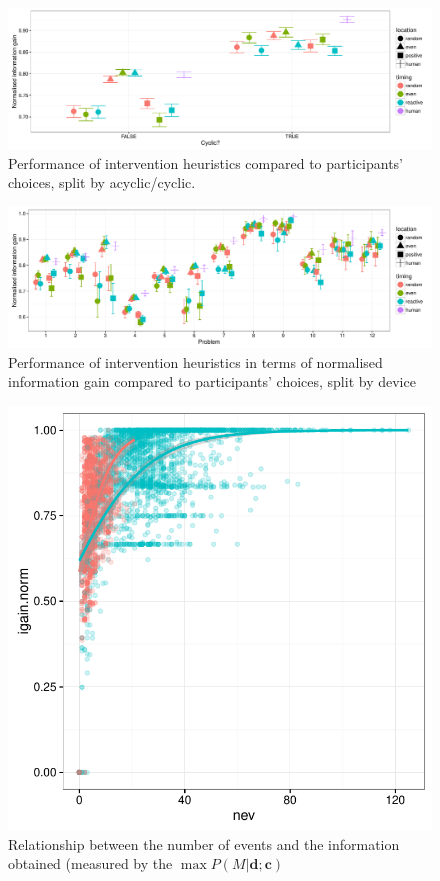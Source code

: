 \documentclass[12pt]{article}
\begin{document}
\begin{figure}[h]
   \centering
   \includegraphics[width = \columnwidth]{int_sim_performance_cyclic}
   \caption{Performance of intervention heuristics compared to participants' choices, split by acyclic/cyclic.}
   \label{fig:int_sim_performance_cyclic}
\end{figure}

\begin{figure}[h]
   \centering
   \includegraphics[width = \columnwidth]{int_sim_performance_trial}
   \caption{Performance of intervention heuristics in terms of normalised information gain compared to participants' choices, split by device}
   \label{fig:int_sim_performance_trial}
\end{figure}


\begin{figure}[h]
   \centering
   \includegraphics[width = .48\columnwidth]{nev_igain_correlation}
   \caption{Relationship between the number of events and the information obtained (measured by the $\max P(M|\mathbf{d};\mathbf{c})$}
   \label{fig:nev_max_p_correlation}
\end{figure}
\end{document}
